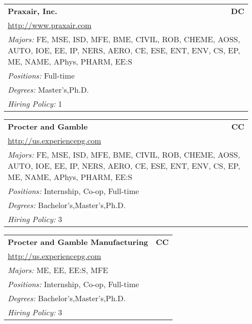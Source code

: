 \documentclass[twoside]{article}
\begin{document}
\begin{center}
\begin{multicols}{3}
\begin{FlushLeft}
\begin{minipage}{.9\columnwidth}\begin{tabularx}{.95\columnwidth}{Xr}
                 {\Large\bf Praxair, Inc.} & {\Large\bf DC}\\
    \multicolumn{2}{p{.95\columnwidth}}{\url{http://www.praxair.com}}\\
    \multicolumn{2}{p{.95\columnwidth}}{\emph{Majors:} FE, MSE, ISD, MFE, BME, CIVIL, ROB, CHEME, AOSS, AUTO, IOE, EE, IP, NERS, AERO, CE, ESE, ENT, ENV, CS, EP, ME, NAME, APhys, PHARM, EE:S}\\
    \multicolumn{2}{p{.95\columnwidth}}{\emph{Positions:} Full-time}\\
    \multicolumn{2}{p{.95\columnwidth}}{\emph{Degrees:} Master's,Ph.D.}\\
    \multicolumn{2}{p{.95\columnwidth}}{\emph{Hiring Policy:} 1}\\
    \end{tabularx}
    
\end{minipage}
 
\begin{minipage}{.9\columnwidth}\begin{tabularx}{.95\columnwidth}{Xr}
                 {\Large\bf Procter and Gamble} & {\Large\bf CC}\\
    \multicolumn{2}{p{.95\columnwidth}}{\url{http://us.experiencepg.com}}\\
    \multicolumn{2}{p{.95\columnwidth}}{\emph{Majors:} FE, MSE, ISD, MFE, BME, CIVIL, ROB, CHEME, AOSS, AUTO, IOE, EE, IP, NERS, AERO, CE, ESE, ENT, ENV, CS, EP, ME, NAME, APhys, PHARM, EE:S}\\
    \multicolumn{2}{p{.95\columnwidth}}{\emph{Positions:} Internship, Co-op, Full-time}\\
    \multicolumn{2}{p{.95\columnwidth}}{\emph{Degrees:} Bachelor's,Master's,Ph.D.}\\
    \multicolumn{2}{p{.95\columnwidth}}{\emph{Hiring Policy:} 3}\\
    \end{tabularx}
    
\end{minipage}
 
\begin{minipage}{.9\columnwidth}\begin{tabularx}{.95\columnwidth}{Xr}
                 {\Large\bf Procter and Gamble Manufacturing} & {\Large\bf CC}\\
    \multicolumn{2}{p{.95\columnwidth}}{\url{http://us.experiencepg.com}}\\
    \multicolumn{2}{p{.95\columnwidth}}{\emph{Majors:} ME, EE, EE:S, MFE}\\
    \multicolumn{2}{p{.95\columnwidth}}{\emph{Positions:} Internship, Co-op, Full-time}\\
    \multicolumn{2}{p{.95\columnwidth}}{\emph{Degrees:} Bachelor's,Master's,Ph.D.}\\
    \multicolumn{2}{p{.95\columnwidth}}{\emph{Hiring Policy:} 3}\\
    \end{tabularx}
    

\end{minipage}
\end{FlushLeft}
\end{multicols}
\end{center}
\end{document}
